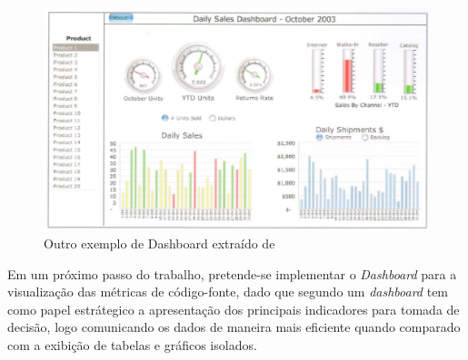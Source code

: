 \begin{figure}[ht!]
\centering
	\includegraphics[keepaspectratio=true,scale=0.8]{figuras/dashboard2.eps}
	\caption{Outro exemplo de Dashboard extraído de 
	}
	\label{dashboard2}
\end{figure}
\FloatBarrier

Em um próximo passo do trabalho, pretende-se implementar o \textit{Dashboard} para a visualização das métricas de código-fonte, dado que segundo  um \textit{dashboard} tem como papel estrátegico a apresentação dos principais indicadores para tomada de decisão, logo comunicando os dados de maneira mais eficiente quando comparado com a exibição de tabelas e gráficos isolados.




